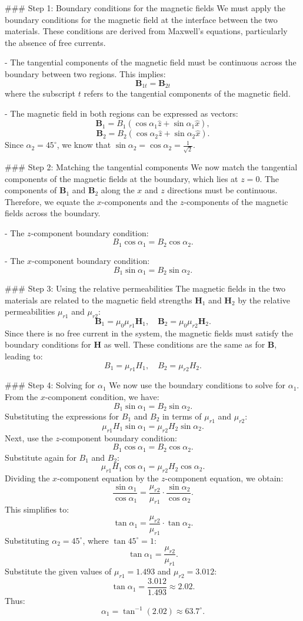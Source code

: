 ### Step 1: Boundary conditions for the magnetic fields
We must apply the boundary conditions for the magnetic field at the interface between the two materials. These conditions are derived from Maxwell’s equations, particularly the absence of free currents.

- The tangential components of the magnetic field must be continuous across the boundary between two regions. This implies:
  \[
  \mathbf{B}_{1t} = \mathbf{B}_{2t}
  \]
  where the subscript $t$ refers to the tangential components of the magnetic field.

- The magnetic field in both regions can be expressed as vectors:
  \[
  \mathbf{B}_1 = B_1 (\cos \alpha_1 \hat{z} + \sin \alpha_1 \hat{x}),
  \]
  \[
  \mathbf{B}_2 = B_2 (\cos \alpha_2 \hat{z} + \sin \alpha_2 \hat{x}).
  \]
  Since $\alpha_2 = 45^\circ$, we know that $\sin \alpha_2 = \cos \alpha_2 = \frac{1}{\sqrt{2}}$.

### Step 2: Matching the tangential components
We now match the tangential components of the magnetic fields at the boundary, which lies at $z = 0$. The components of $\mathbf{B}_1$ and $\mathbf{B}_2$ along the $x$ and $z$ directions must be continuous. Therefore, we equate the $x$-components and the $z$-components of the magnetic fields across the boundary.

- The $z$-component boundary condition:
  \[
  B_1 \cos \alpha_1 = B_2 \cos \alpha_2.
  \]

- The $x$-component boundary condition:
  \[
  B_1 \sin \alpha_1 = B_2 \sin \alpha_2.
  \]

### Step 3: Using the relative permeabilities
The magnetic fields in the two materials are related to the magnetic field strengths $\mathbf{H}_1$ and $\mathbf{H}_2$ by the relative permeabilities $\mu_{r1}$ and $\mu_{r2}$:
\[
\mathbf{B}_1 = \mu_0 \mu_{r1} \mathbf{H}_1, \quad \mathbf{B}_2 = \mu_0 \mu_{r2} \mathbf{H}_2.
\]
Since there is no free current in the system, the magnetic fields must satisfy the boundary conditions for $\mathbf{H}$ as well. These conditions are the same as for $\mathbf{B}$, leading to:
\[
B_1 = \mu_{r1} H_1, \quad B_2 = \mu_{r2} H_2.
\]

### Step 4: Solving for $\alpha_1$
We now use the boundary conditions to solve for $\alpha_1$. From the $x$-component condition, we have:
\[
B_1 \sin \alpha_1 = B_2 \sin \alpha_2.
\]
Substituting the expressions for $B_1$ and $B_2$ in terms of $\mu_{r1}$ and $\mu_{r2}$:
\[
\mu_{r1} H_1 \sin \alpha_1 = \mu_{r2} H_2 \sin \alpha_2.
\]
Next, use the $z$-component boundary condition:
\[
B_1 \cos \alpha_1 = B_2 \cos \alpha_2.
\]
Substitute again for $B_1$ and $B_2$:
\[
\mu_{r1} H_1 \cos \alpha_1 = \mu_{r2} H_2 \cos \alpha_2.
\]
Dividing the $x$-component equation by the $z$-component equation, we obtain:
\[
\frac{\sin \alpha_1}{\cos \alpha_1} = \frac{\mu_{r2}}{\mu_{r1}} \cdot \frac{\sin \alpha_2}{\cos \alpha_2}.
\]
This simplifies to:
\[
\tan \alpha_1 = \frac{\mu_{r2}}{\mu_{r1}} \cdot \tan \alpha_2.
\]
Substituting $\alpha_2 = 45^\circ$, where $\tan 45^\circ = 1$:
\[
\tan \alpha_1 = \frac{\mu_{r2}}{\mu_{r1}}.
\]
Substitute the given values of $\mu_{r1} = 1.493$ and $\mu_{r2} = 3.012$:
\[
\tan \alpha_1 = \frac{3.012}{1.493} \approx 2.02.
\]
Thus:
\[
\alpha_1 = \tan^{-1}(2.02) \approx 63.7^\circ.
\]

